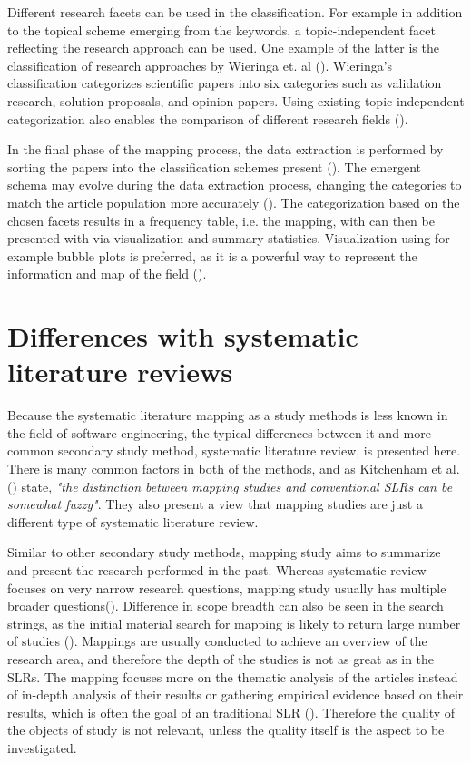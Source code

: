 \documentclass[utf8,english]{gradu3}
\begin{document}
Different research facets can be used in the classification. For example in
addition to the topical scheme emerging from the keywords, a topic-independent
facet reflecting the research approach can be used. One example of the latter is
the classification of research approaches by Wieringa et. al
(\cite*{wieringa2006}). Wieringa's classification categorizes scientific papers
into six categories such as validation research, solution proposals, and opinion
papers. Using existing topic-independent categorization also enables the
comparison of  different research fields (\cite{petersen2015}).

In the final phase of the mapping process, the data extraction is performed by
sorting the papers into the classification schemes present
(\cite{petersen2008}). The emergent schema may evolve during the data extraction
process, changing the categories to match the article population more accurately
(\cite{petersen2015}). The categorization based on the chosen facets results in
a frequency table, i.e. the mapping, with can then be presented with via
visualization and summary statistics. Visualization using for example bubble
plots is preferred, as it is a powerful way to represent the information and map
of the field (\cite{petersen2008}).


\section{Differences with systematic literature reviews}

Because the systematic literature mapping as a study methods is less known in
the field of software engineering, the typical differences between it and more
common secondary study method, systematic literature review, is presented here.
There is many common factors in both of the methods, and as Kitchenham et al.
(\cite*{kitchenham2010}) state, \textit{"the distinction between mapping studies
and conventional SLRs can be somewhat fuzzy"}. They also present a view that
mapping studies are just a different type of systematic literature review.

Similar to other secondary study methods, mapping study aims to summarize and
present the research performed in the past. Whereas systematic review focuses on
very narrow research questions, mapping study usually has multiple broader
questions(\cite{kitchenham2010}). Difference in scope breadth can also be seen
in the search strings, as the initial material search for mapping is likely to
return large number of studies (\cite{kitchenham2007, petersen2008}). Mappings
are usually conducted to achieve an overview of the research area, and therefore
the depth of the studies is not as great as in the SLRs. The mapping focuses
more on the thematic analysis of the articles instead of in-depth analysis of
their results or gathering empirical evidence based on their results, which is
often the goal of an traditional SLR (\cite{petersen2008}). Therefore the
quality of the objects of study is not relevant, unless the quality itself is
the aspect to be investigated.
\end{document}
